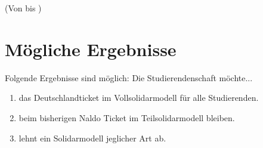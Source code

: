 \begin{displayquote}
 (Von  bis )
\end{displayquote}

\chapter{Mögliche Ergebnisse}
\label{sect:results}
\bigskip

Folgende Ergebnisse sind möglich:
Die Studierendenschaft möchte...
\begin{enumerate}
    \item das Deutschlandticket im Vollsolidarmodell für alle Studierenden.
    \item beim bisherigen Naldo Ticket im Teilsolidarmodell bleiben.
    \item lehnt ein Solidarmodell jeglicher Art ab.
\end{enumerate}

